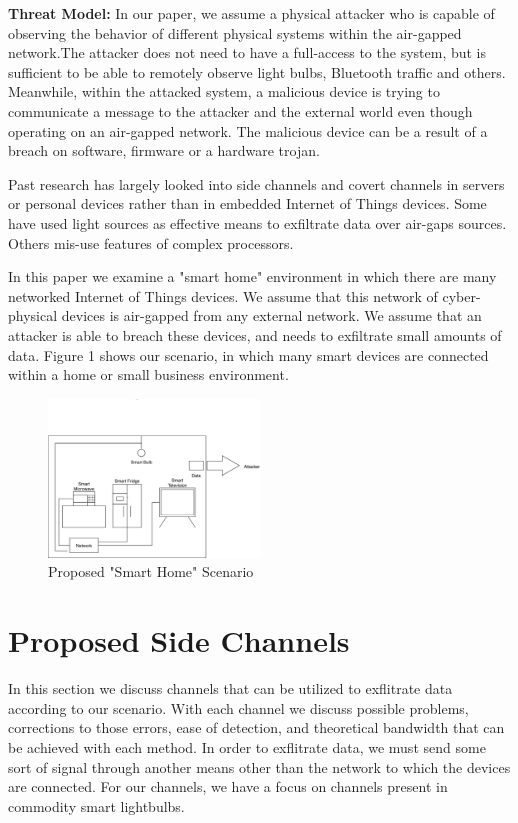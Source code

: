 \documentclass[conference]{IEEEtran}
\begin{document}
\textbf{Threat Model:} In our paper, we assume a physical attacker who is capable of observing the behavior of different physical systems within the air-gapped network.The attacker does not need to have a full-access to the system, but is sufficient to be able to remotely observe light bulbs, Bluetooth traffic and others. Meanwhile, within the attacked system, a malicious device is trying to communicate a message to the attacker and the external world even though operating on an air-gapped network. The malicious device can be a result of a breach on software, firmware or a hardware trojan.  

Past research has largely looked into side channels and covert channels in servers or personal devices rather than in embedded Internet of Things devices\cite{Opt}\cite{spc}\cite{iOS}. Some have used light sources as effective means to exfiltrate data over air-gaps sources\cite{Opt}. Others mis-use features of complex processors\cite{spc}. 

In this paper we examine a "smart home" environment in which there are many networked Internet of Things devices. We assume that this network of cyber-physical devices is air-gapped from any external network. We assume that an attacker is able to breach these devices, and needs to exfiltrate small amounts of data. Figure 1 shows our scenario, in which many smart devices are connected within a home or small business environment.

\begin{figure}
    \centering
    \includegraphics[width=0.5\textwidth]{scenario.png}
    \caption{Proposed "Smart Home" Scenario}
\end{figure}


\section{Proposed Side Channels}
\label{sec:attacks}
In this section we discuss channels that can be utilized to exflitrate data according to our scenario. With each channel we discuss possible problems, corrections to those errors, ease of detection, and theoretical bandwidth that can be achieved with each method. In order to exflitrate data, we must send some sort of signal through another means other than the network to which the devices are connected. For our channels, we have a focus on channels present in commodity smart lightbulbs. 
\end{document}
